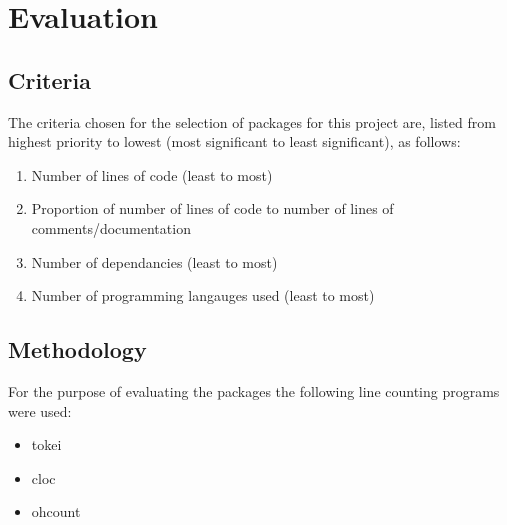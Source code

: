 \section{Evaluation}\label{Evaluation}

\subsection{Criteria}

The criteria chosen for the selection of packages for this project are, listed from highest priority to lowest (most significant to least significant), as follows:

\begin{enumerate}
    \item Number of lines of code (least to most)
    \item Proportion of number of lines of code to number of lines of comments/documentation
    \item Number of dependancies (least to most)
    \item Number of programming langauges used (least to most)
\end{enumerate}

\subsection{Methodology}

For the purpose of evaluating the packages the following line counting programs were used:

\begin{itemize}
    \item tokei
    \item cloc
    \item ohcount
\end{itemize}
